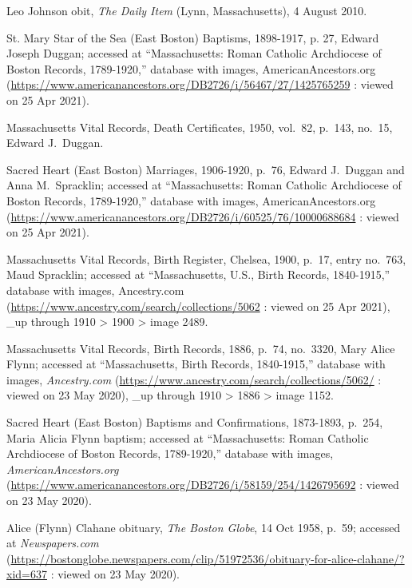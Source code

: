 \begin{thebibliography}{999}
Leo Johnson obit, \textit{The Daily Item} (Lynn, Massachusetts), 4 August 2010.


St. Mary Star of the Sea (East Boston) Baptisms, 1898-1917, p. 27, Edward Joseph Duggan; accessed at ``Massachusetts: Roman Catholic Archdiocese of Boston Records, 1789-1920,'' database with images, AmericanAncestors.org (\url{https://www.americanancestors.org/DB2726/i/56467/27/1425765259} : viewed on 25 Apr 2021).

Massachusetts Vital Records, Death Certificates, 1950, vol.\ 82, p.\ 143, no.\ 15, Edward J.\ Duggan.

Sacred Heart (East Boston) Marriages, 1906-1920, p.\ 76, Edward J.\ Duggan and Anna M.\ Spracklin; accessed at ``Massachusetts: Roman Catholic Archdiocese of Boston Records, 1789-1920,'' database with images, AmericanAncestors.org (\url{https://www.americanancestors.org/DB2726/i/60525/76/10000688684} : viewed on 25 Apr 2021).

Massachusetts Vital Records, Birth Register, Chelsea, 1900, p.\ 17, entry no.\ 763, Maud Spracklin; accessed at ``Massachusetts, U.S., Birth Records, 1840-1915,'' database with images, Ancestry.com (\url{https://www.ancestry.com/search/collections/5062} : viewed on 25 Apr 2021), \_up through 1910 > 1900 > image 2489.


Massachusetts Vital Records, Birth Records, 1886, p.\ 74, no.\ 3320, Mary Alice Flynn; accessed at ``Massachusetts, Birth Records, 1840-1915,'' database with images, \textit{Ancestry.com} (\url{https://www.ancestry.com/search/collections/5062/} : viewed on 23 May 2020), \_up through 1910 > 1886 > image 1152.

Sacred Heart (East Boston) Baptisms and Confirmations, 1873-1893, p.\ 254, Maria Alicia Flynn baptism; accessed at ``Massachusetts: Roman Catholic Archdiocese of Boston Records, 1789-1920,'' database with images, \textit{AmericanAncestors.org} (\url{https://www.americanancestors.org/DB2726/i/58159/254/1426795692} : viewed on 23 May 2020).

Alice (Flynn) Clahane obituary, \textit{The Boston Globe}, 14 Oct 1958, p.\ 59; accessed at \textit{Newspapers.com} (\url{https://bostonglobe.newspapers.com/clip/51972536/obituary-for-alice-clahane/?xid=637} : viewed on 23 May 2020).


\end{thebibliography}
